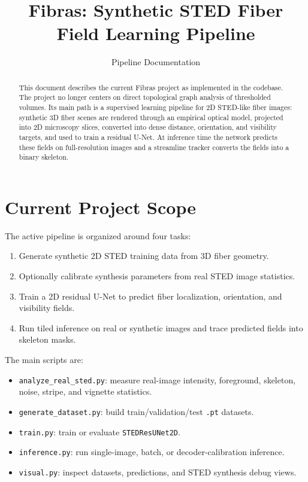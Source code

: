 \documentclass[11pt, a4paper]{article}
\title{\textbf{Fibras: Synthetic STED Fiber Field Learning Pipeline}}
\author{Pipeline Documentation}
\date{}
\begin{document}
\maketitle

\begin{abstract}
This document describes the current Fibras project as implemented in the codebase.
The project no longer centers on direct topological graph analysis of thresholded
volumes. Its main path is a supervised learning pipeline for 2D STED-like fiber
images: synthetic 3D fiber scenes are rendered through an empirical optical model,
projected into 2D microscopy slices, converted into dense distance, orientation,
and visibility targets, and used to train a residual U-Net. At inference time the
network predicts these fields on full-resolution images and a streamline tracker
converts the fields into a binary skeleton.
\end{abstract}

\section{Current Project Scope}

The active pipeline is organized around four tasks:
\begin{enumerate}
    \item Generate synthetic 2D STED training data from 3D fiber geometry.
    \item Optionally calibrate synthesis parameters from real STED image statistics.
    \item Train a 2D residual U-Net to predict fiber localization, orientation, and visibility fields.
    \item Run tiled inference on real or synthetic images and trace predicted fields into skeleton masks.
\end{enumerate}

The main scripts are:
\begin{itemize}
    \item \texttt{analyze\_real\_sted.py}: measure real-image intensity, foreground, skeleton, noise, stripe, and vignette statistics.
    \item \texttt{generate\_dataset.py}: build train/validation/test \texttt{.pt} datasets.
    \item \texttt{train.py}: train or evaluate \texttt{STEDResUNet2D}.
    \item \texttt{inference.py}: run single-image, batch, or decoder-calibration inference.
    \item \texttt{visual.py}: inspect datasets, predictions, and STED synthesis debug views.
\end{itemize}
\end{document}

